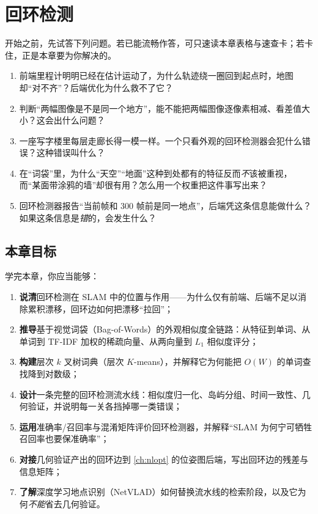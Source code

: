 \chapter{回环检测}
\label{ch:loop}


\begin{practice}[前置自测]
开始之前，先试答下列问题。若已能流畅作答，可只速读本章表格与速查卡；若卡住，正是本章要为你解决的。
\begin{enumerate}
  \item 前端里程计明明已经在估计运动了，为什么轨迹绕一圈回到起点时，地图却“对不齐”？后端优化为什么救不了它？
  \item 判断“两幅图像是不是同一个地方”，能不能把两幅图像逐像素相减、看差值大小？这会出什么问题？
  \item 一座写字楼里每层走廊长得一模一样。一个只看外观的回环检测器会犯什么错误？这种错误叫什么？
  \item 在“词袋”里，为什么“天空”“地面”这种到处都有的特征反而\emph{不}该被重视，而“某面带涂鸦的墙”却很有用？怎么用一个权重把这件事写出来？
  \item 回环检测器报告“当前帧和 $300$ 帧前是同一地点”，后端凭这条信息能做什么？如果这条信息是\emph{错}的，会发生什么？
\end{enumerate}
\end{practice}

\section*{本章目标}
学完本章，你应当能够：
\begin{enumerate}
  \item \textbf{说清}回环检测在 SLAM 中的位置与作用——为什么仅有前端、后端不足以消除累积漂移，回环边如何把漂移“拉回”；
  \item \textbf{推导}基于视觉词袋（Bag-of-Words）的外观相似度全链路：从特征到单词、从单词到 TF-IDF 加权的稀疏向量、从两向量到 $L_1$ 相似度评分；
  \item \textbf{构建}层次 $k$ 叉树词典（层次 $K$-means），并解释它为何能把 $O(W)$ 的单词查找降到对数级；
  \item \textbf{设计}一条完整的回环检测流水线：相似度归一化、岛屿分组、时间一致性、几何验证，并说明每一关各挡掉哪一类错误；
  \item \textbf{运用}准确率/召回率与混淆矩阵评价回环检测器，并解释“SLAM 为何宁可牺牲召回率也要保准确率”；
  \item \textbf{对接}几何验证产出的回环边到 \cref{ch:nlopt} 的位姿图后端，写出回环边的残差与信息矩阵；
  \item \textbf{了解}深度学习地点识别（NetVLAD）如何替换流水线的检索阶段，以及它为何\emph{不能}省去几何验证。
\end{enumerate}

